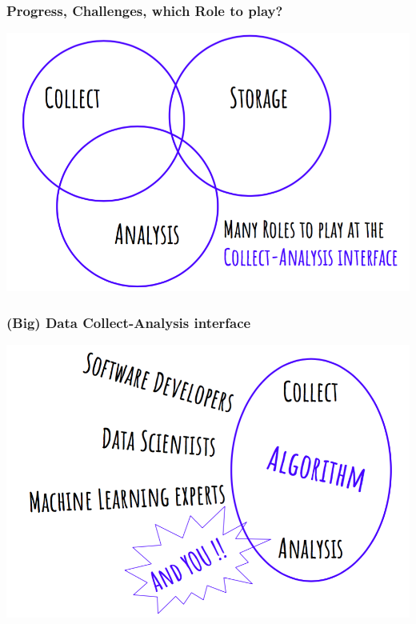 \begin{frame}
\frametitle{Progress, Challenges, which Role to play?}
\vskip 0.8cm
    \includegraphics[width=1.0\textwidth]{./pictures/roles-in-data.png}\\
\end{frame}

\begin{frame}
\frametitle{(Big) Data Collect-Analysis interface}
\vskip 1.0cm
    \includegraphics[width=1.0\textwidth]{./pictures/role-2.png}\\

\end{frame}


